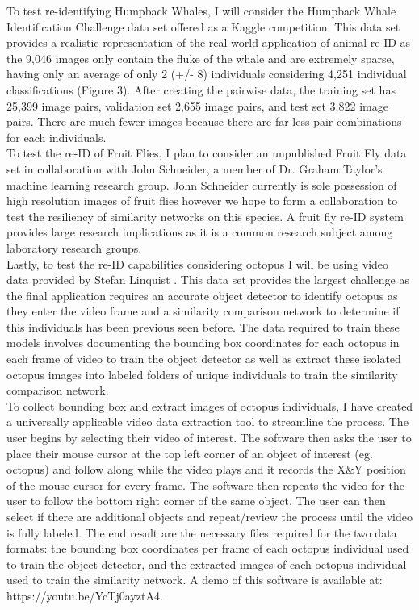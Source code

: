 \documentclass[11pt]{article}
\begin{document}
\noindent
To test re-identifying Humpback Whales, I will consider the Humpback Whale Identification Challenge data set offered as a Kaggle competition. This data set provides a realistic representation of the real world application of animal re-ID as the 9,046 images only contain the fluke of the whale and are extremely sparse, having only an average of only 2 (+/- 8) individuals considering 4,251 individual classifications (Figure 3). After creating the pairwise data, the training set has 25,399 image pairs, validation set 2,655 image pairs, and test set 3,822 image pairs. There are much fewer images because there are far less pair combinations for each individuals.
\newline
\\
To test the re-ID of Fruit Flies, I plan to consider an unpublished Fruit Fly data set in collaboration with John Schneider, a member of Dr. Graham Taylor's machine learning research group. John Schneider currently is sole possession of high resolution images of fruit flies however we hope to form a collaboration to test the resiliency of similarity networks on this species. A fruit fly re-ID system provides large research implications as it is a common research subject among laboratory research groups. 
\newline
\\
Lastly, to test the re-ID capabilities considering octopus I will be using video data provided by Stefan Linquist \cite{scheel2017second}. This data set provides the largest challenge as the final application requires an accurate object detector to identify octopus as they enter the video frame and a similarity comparison network to determine if this individuals has been previous seen before. The data required to train these models involves documenting the bounding box coordinates for each octopus in each frame of video to train the object detector as well as extract these isolated octopus images into labeled folders of unique individuals to train the similarity comparison network.
\newline
\\
To collect bounding box and extract images of octopus individuals, I have created a universally applicable video data extraction tool to streamline the process. The user begins by selecting their video of interest. The software then asks the user to place their mouse cursor at the top left corner of an object of interest (eg. octopus) and follow along while the video plays and it records the X\&Y position of the mouse cursor for every frame. The software then repeats the video for the user to follow the bottom right corner of the same object. The user can then select if there are additional objects and repeat/review the process until the video is fully labeled. The end result are the necessary files required for the two data formats: the bounding box coordinates per frame of each octopus individual used to train the object detector, and the extracted images of each octopus individual used to train the similarity network. A demo of this software is available at: https://youtu.be/YcTj0ayztA4.
\end{document}
